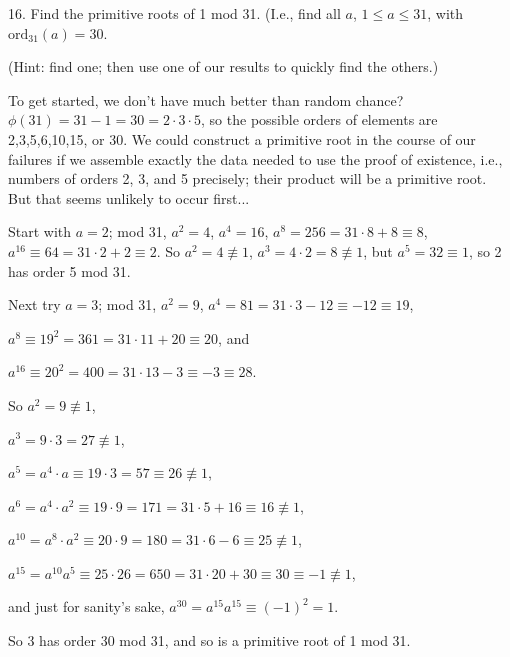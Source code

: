 
\bsk


\item{16.} Find the primitive roots of 1 mod 31. (I.e., find all $a$, $1\leq a\leq 31$, with
$\text{ord}_{31}(a)=30$. 

\ssk

\item{} (Hint: find one; then use one of our results to quickly find the others.)

\msk

\ni To get started, we don't have much better than random chance? 
$\phi(31)=31-1=30=2\cdot 3\cdot 5$, so the possible orders of elements
are 2,3,5,6,10,15, or 30. We could construct a primitive root in the course of
our failures if we assemble exactly the data needed to use the proof of existence, i.e., 
numbers of orders 2, 3, and 5 precisely; their product will be a primitive root.
But that seems unlikely to occur first...

\msk

\ni Start with $a=2$; mod 31, $a^2=4$, $a^4=16$, $a^8=256=31\cdot 8 +8\equiv 8$, $a^{16}\equiv 64=31\cdot 2+2\equiv 2$. 
So $a^2=4\not\equiv 1$, $a^3=4\cdot 2=8\not\equiv 1$, but $a^5=32\equiv 1$, so 2 has order 5 mod 31.

\ssk 

\ni Next try $a=3$; mod 31, $a^2=9$, $a^4=81=31\cdot 3-12\equiv -12\equiv 19$, 

\ni $a^8\equiv 19^2=361=31\cdot 11+20\equiv 20$, and 

\ni $a^{16}\equiv 20^2=400=31\cdot 13-3\equiv -3\equiv 28$.

\ssk

\ni So $a^2=9\not\equiv 1$, 

\ni $a^3=9\cdot 3=27\not\equiv 1$, 

\ni $a^5=a^4\cdot a\equiv 19\cdot 3=57\equiv 26\not\equiv 1$,

\ni $a^6=a^4\cdot a^2\equiv 19\cdot 9=171=31\cdot 5+16\equiv 16\not\equiv 1$, 

\ni $a^{10}=a^8\cdot a^2\equiv 20\cdot 9=180=31\cdot 6-6\equiv 25\not\equiv 1$, 

\ni $a^{15}=a^{10}a^5\equiv 25\cdot 26=650=31\cdot 20+30\equiv 30\equiv -1\not\equiv 1$, 

\ni and just for 
sanity's sake, $a^{30}=a^{15}a^{15}\equiv (-1)^2=1$. 

\ni So 3 has order 30 mod 31, and so is a primitive
root of 1 mod 31.

